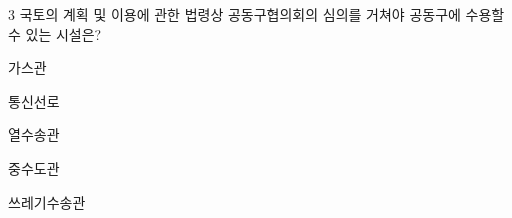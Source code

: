 \begin{question}{3}
국토의 계획 및 이용에 관한 법령상 공동구협의회의 심의를 거쳐야 공동구에 수용할 수 있는 시설은?
\begin{choices}
  \item 가스관
  \item 통신선로
  \item 열수송관
  \item 중수도관
  \item 쓰레기수송관
\end{choices}
\end{question}
